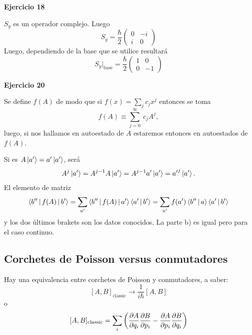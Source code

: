\documentclass[10pt,oneside]{CBFT_book}
\begin{document}
\begin{ejemplo}{\bf Ejercicio 18}

$S_y$ es un operador complejo. Luego
\[
	S_y = \frac{\hbar}{2} \begin{pmatrix}
	                       0 & -i \\
	                       i & 0
	                      \end{pmatrix}
\]
Luego, dependiendo de la base que se utilice resultará
\[
	S_y|_\text{base} = \frac{\hbar}{2} \begin{pmatrix}
	                       1 & 0 \\
	                       0 & -1
	                      \end{pmatrix}
\]
 
\end{ejemplo}

\begin{ejemplo}{\bf Ejercicio 20}

Se define $f(A)$ de modo que si $f(x) = \sum_j c_j x^j$ entonces se toma
\[
	f(A) \equiv \sum_{j=0}^\infty \: c_j A^j,
\]
luego, si nos hallamos en autoestado de $A$ estaremos entonces en autoestados de $f(A)$.

Si es $A\Ket{a'} = a' \Ket{a'}$, será
\[
	A^j\Ket{a'} = A^{j-1}A\Ket{a'} = A^{j-1}a'\Ket{a'} = {a'}^j\Ket{a'}.
\]
El elemento de matriz
\[
	\Braket{b''|f(A)|b'} =  \sum_{a'} \Braket{b''|f(A)|a'} \Braket{a'|b'} =
	\sum_{a'} f(a')\Braket{b''|a} \Braket{a'|b'}
\]
y los dos últimos brakets son los datos conocidos.
La parte b) es igual pero para el caso continuo.
 
\end{ejemplo}

\subsection{Corchetes de Poisson versus conmutadores}

Hay una equivalencia entre corchetes de Poisson y conmutadores, a saber:
\[
	[A, B]_{\text{classic}} \longrightarrow \frac{1}{i\hbar}[A,B]
\]
o
\[
	[A, B]_{\text{classic}} = \sum_i \left( \frac{\partial^{\hspace{-0.05em}} {A}}{\partial {q_i}^{\hspace{-0.05em}}} \frac{\partial^{\hspace{-0.05em}} {B}}{\partial {p_i}^{\hspace{-0.05em}}} - \frac{\partial^{\hspace{-0.05em}} {A}}{\partial {p_i}^{\hspace{-0.05em}}} \frac{\partial^{\hspace{-0.05em}} {B}}{\partial {q_i}^{\hspace{-0.05em}}} \right)
\]

\end{document}
